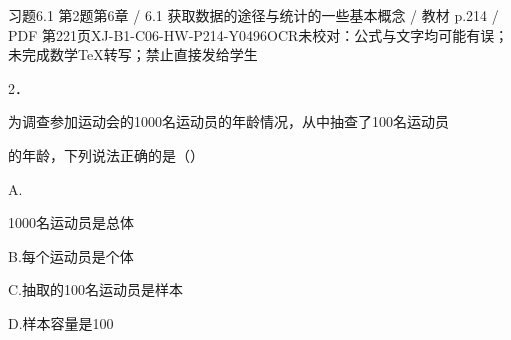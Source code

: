 \begin{bankitem}{习题6.1 第2题}{第6章 / 6.1 获取数据的途径与统计的一些基本概念 / 教材 p.214 / PDF 第221页}{XJ-B1-C06-HW-P214-Y0496}{OCR未校对：公式与文字均可能有误；未完成数学TeX转写；禁止直接发给学生}
\begin{ocrdraft}
\par
2．
\par
为调查参加运动会的1000名运动员的年龄情况，从中抽查了100名运动员
\par
的年龄，下列说法正确的是（）
\par
A.
\par
1000名运动员是总体
\par
B.每个运动员是个体
\par
C.抽取的100名运动员是样本
\par
D.样本容量是100
\end{ocrdraft}
\end{bankitem}
